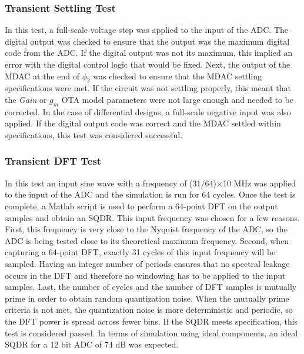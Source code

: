 \subsubsection{Transient Settling Test}
\label{sec:transettling}
In this test, a full-scale voltage step was applied to the input of the ADC. The digital output was checked to ensure that the output was the maximum digital code from the ADC. If the digital output was not its maximum, this implied an error with the digital control logic that would be fixed. Next, the output of the MDAC at the end of $\phi_{2}$ was checked to ensure that the MDAC settling specifications were met. If the circuit was not settling properly, this meant that the \emph{Gain} or \emph{$g_{m}$} OTA model parameters were not large enough and needed to be corrected. In the case of differential designs, a full-scale negative input was also applied. If the digital output code was correct and the MDAC settled within specifications, this test was considered successful.
\subsubsection{Transient DFT Test}
\label{sec:transientdft}
 In this test an input sine wave with a frequency of (31/64)$\times$10 MHz was applied to the input of the ADC and the simulation is run for 64 cycles. Once the test is complete, a Matlab script is used to perform a 64-point DFT on the output samples and obtain an SQDR. This input frequency was chosen for a few reasons. First, this frequency is very close to the Nyquist frequency of the ADC, so the ADC is being tested close to its theoretical maximum frequency. Second, when capturing a 64-point DFT, exactly 31 cycles of this input frequency will be sampled. Having an integer number of periods ensures that no spectral leakage occurs in the DFT and therefore no windowing has to be applied to the input samples. Last, the number of cycles and the number of DFT samples is mutually prime in order to obtain random quantization noise. When the mutually prime criteria is not met, the quantization noise is more deterministic and periodic, so the DFT power is spread across fewer bins. If the SQDR meets specification, this test is considered passed. In terms of simulation using ideal components, an ideal SQDR for a 12 bit ADC of 74 dB was expected.
